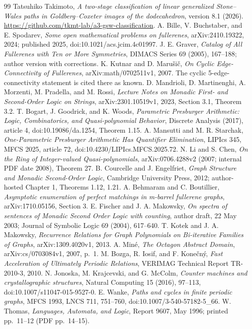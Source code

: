 \documentclass[11pt]{amsart}
\theoremstyle{definition}\newtheorem{definition}{Definition}
\begin{document}
\clearpage
\begin{thebibliography}{99}
 Tatsuhiko Takimoto,
\emph{A two-stage classification of linear generalized Stone--Wales paths in
Goldberg--Coxeter images of the dodecahedron}, version 8.1 (2026).
{\url{https://github.com/tkmt-lab/a3-gsw-classification}}.
 A. Bille, V. Buchstaber, and E. Spodarev,
\emph{Some open mathematical problems on fullerenes}, arXiv:2410.19322,
2024; published 2025, doi:10.1021/acs.jcim.4c01997.
 J. E. Graver,
\emph{Catalog of All Fullerenes with Ten or More Symmetries},
DIMACS Series 69 (2005), 167--188; author version with corrections.
 K. Kutnar and D. Maru\v{s}i\v{c},
\emph{On Cyclic Edge-Connectivity of Fullerenes}, arXiv:math/0702511v1,
2007. The cyclic 5-edge-connectivity statement is cited there as known.
 D. Mandrioli, D. Martinenghi, A. Morzenti,
M. Pradella, and M. Rossi,
\emph{Lecture Notes on Monadic First- and Second-Order Logic on Strings},
arXiv:2301.10519v1, 2023, Section 3.1, Theorem 3.2.
 T. Bogart, J. Goodrick, and K. Woods,
\emph{Parametric Presburger Arithmetic: Logic, Combinatorics, and
Quasi-polynomial Behavior}, Discrete Analysis (2017), article 4,
doi:10.19086/da.1254, Theorem 1.15.
 A. Mansutti and M. R. Starchak,
\emph{One-Parametric Presburger Arithmetic Has Quantifier Elimination},
LIPIcs 345, MFCS 2025, article 72, doi:10.4230/LIPIcs.MFCS.2025.72.
 N. Li and S. Chen,
\emph{On the Ring of Integer-valued Quasi-polynomials},
arXiv:0706.4288v2 (2007; internal PDF date 2008), Theorem 27.
 B. Courcelle and J. Engelfriet,
\emph{Graph Structure and Monadic Second-Order Logic}, Cambridge
University Press, 2012; author-hosted Chapter 1, Theorems 1.12, 1.21.
 A. Behmaram and C. Boutillier,
\emph{Asymptotic enumeration of perfect matchings in m-barrel fullerene graphs},
arXiv:1710.05156, Section 3.
 E. Fischer and J. A. Makowsky,
\emph{On spectra of sentences of Monadic Second Order Logic with counting},
author draft, 22 May 2003; Journal of Symbolic Logic 69 (2004), 617--640.
 T. Kotek and J. A. Makowsky,
\emph{Recurrence Relations for Graph Polynomials on Bi-iterative
Families of Graphs}, arXiv:1309.4020v1, 2013.
 A. Min\'e, \emph{The Octagon Abstract Domain},
arXiv:cs/0703084v1, 2007, p.~1.
 M. Bozga, R. Iosif, and F. Kone\v{c}n\'y,
\emph{Fast Acceleration of Ultimately Periodic Relations},
VERIMAG Technical Report TR-2010-3, 2010.
 N. Jonoska, M. Krajcevski, and G. McColm,
\emph{Counter machines and crystallographic structures},
Natural Computing 15 (2016), 97--113,
doi:10.1007/s11047-015-9527-0.
 E. Wanke, \emph{Paths and cycles in finite periodic graphs},
MFCS 1993, LNCS 711, 751--760,
doi:10.1007/3-540-57182-5\_66.
 W. Thomas, \emph{Languages, Automata, and Logic},
Report 9607, May 1996; printed pp.~11--12 (PDF pp.~14--15).
\end{thebibliography}
\end{document}
